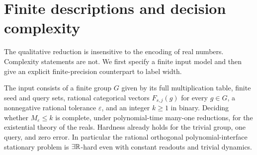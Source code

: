 \section{Finite descriptions and decision complexity}\label{sec:complexity56}
The qualitative reduction is insensitive to the encoding of real numbers. Complexity statements are not. We first specify a finite input model and then give an explicit finite-precision counterpart to label width.

\begin{theorem}\label{thm:ETR56}
The input consists of a finite group $G$ given by its full multiplication table, finite seed and query sets, rational categorical vectors $F_{s,j}(g)$ for every $g\in G$, a nonnegative rational tolerance $\varepsilon$, and an integer $k\ge1$ in binary. Deciding whether $M_\varepsilon\le k$ is complete, under polynomial-time many-one reductions, for the existential theory of the reals. Hardness already holds for the trivial group, one query, and zero error. In particular the rational orthogonal polynomial-interface stationary problem is $\exists\mathbb R$-hard even with constant readouts and trivial dynamics.
\end{theorem}
